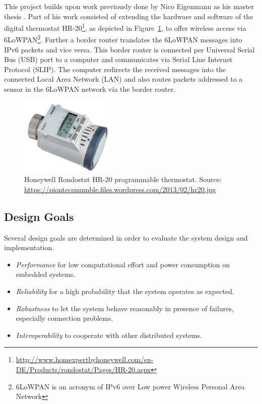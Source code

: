 This project builds upon work previously done by Nico Eigenmann as his master thesis \cite{eigenmann2012opportunisticSensing}.
Part of his work consisted of extending the hardware and software of the digital thermostat HR-20\footnote{\url{http://www.homexpertbyhoneywell.com/en-DE/Products/rondostat/Pages/HR-20.aspx}}, as depicted in Figure~\ref{fig:honeywell_hr20}, to offer wireless access via 6LoWPAN\footnote{6LoWPAN is an acronym of IPv6 over Low power Wireless Personal Area Network}.
Further a border router translates the 6LoWPAN messages into IPv6 packets and vice versa.
This border router is connected per Universal Serial Bus (USB) port to a computer and communicates via Serial Line Internet Protocol (SLIP).
The computer redirects the received messages into the connected Local Area Network (LAN) and also routes packets addressed to a sensor in the 6LoWPAN network via the border router.

\begin{figure}[h]
	\begin{center}
		\includegraphics[width=0.4\textwidth]{images/hr20.jpg}
	\end{center}
	\caption{Honeywell Rondostat HR-20 programmable thermostat. Source: \url{https://piontecsmumble.files.wordpress.com/2013/02/hr20.jpg}}
	\label{fig:honeywell_hr20}
\end{figure}

\subsection{Design Goals}

Several design goals are determined in order to evaluate the system design and implementation.

\begin{itemize}
	\item \emph{Performance} for low computational effort and power consumption on embedded systems.
	\item \emph{Reliability} for a high probability that the system operates as expected.
	\item \emph{Robustness} to let the system behave reasonably in presence of failures, especially connection problems.
	\item \emph{Interoperability} to cooperate with other distributed systems.
\end{itemize}

